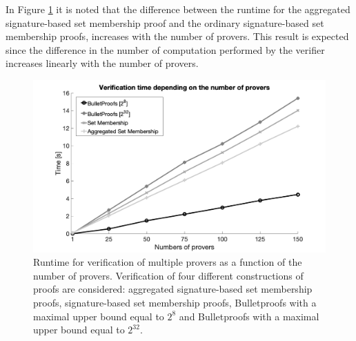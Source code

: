 In Figure \ref{fig:NrClients} it is noted that the difference between the runtime for the aggregated signature-based set membership proof and the ordinary signature-based set membership proofs, increases with the number of provers. This result is expected since the difference in the number of computation performed by the verifier increases linearly with the number of provers. 




 \begin{figure}[]
\includegraphics[width=\linewidth]{./figure/verificationNbrClients.png}
\caption{Runtime for verification of multiple provers as a function of the number of provers. Verification of four different constructions of proofs  are considered: aggregated signature-based set membership proofs, signature-based set membership proofs, Bulletproofs with a maximal upper bound equal to $2^8$ and Bulletproofs with a maximal upper bound equal  to $2^{32}$.}
\label{fig:NrClients}
\end{figure}
